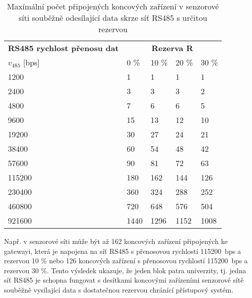 \begin{table}[h]
\centering
\footnotesize
\caption{Maxímální počet připojených koncových zařízení v senzorové síti souběžně odesílající data skrze síť RS485 s určitou rezervou} 
\begin{ctucolortab}
\begin{tabular} {|p{2.5cm}|llll|}
    \hline

\textbf{RS485 rychlost přenosu dat} &       \multicolumn{4}{c|}{\textbf{Rezerva R}}	  	    \\

$v_{485}$ {[bps]}  &	0 \%	&	10 \%	&	20 \%	&	30 \%  \\ \hline

  1200~~~ &    1	&    1	&    1	&    1 \\
  2400~~~ &    3	&    3	&    3	&    2 \\
  4800~~~ &    7	&    6	&    6	&    5 \\
  9600~~~ &   15	&   13	&   12	&   10 \\
 19200~~~ &   30	&   27	&   24	&   21 \\
 38400~~~ &   60	&   54	&   48	&   42 \\
 57600~~~ &   90	&   81	&   72	&   63 \\
115200~~~ &  180	&  162	&  144	&  126 \\
230400~~~ &  360	&  324	&  288	&  252 \\
460800~~~ &  720	&  648	&  576	&  504 \\
921600~~~ & 1440	& 1296	& 1152	& 1008 \\
\hline

\end{tabular}
\end{ctucolortab}

\label{tab:max-sensor-nodes}
\end{table}


Např. v senzorové síti může být až 162 koncových zařízení připojených ke gatewayi, která je napojena na síť RS485 s přenosovou rychlostí 115200~bps a rezervou 10 \% nebo 126 koncových zařízení s přenosovou rychlostí 115200~bps a rezervou 30 \%.
Tento výsledek ukazuje, že jeden blok patra univerzity, tj. jedna síť RS485 je schopna fungovat s desítkami koncovými zařízeními senzorové sítě souběžně vysílající data s dostatečnou rezervou chránící přístupový systém. 







